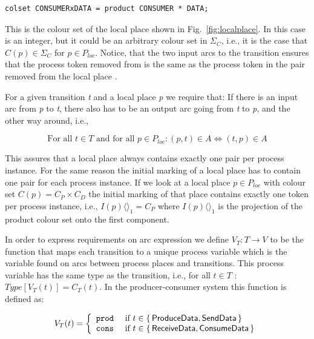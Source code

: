 \begin{verbatim}
colset CONSUMERxDATA = product CONSUMER * DATA;
\end{verbatim} 

\noindent
This is the colour set of the local place  shown in Fig.~\ref{fig:localplace}. In this case  is an integer, but it could be an arbitrary colour set in $\Sigma_{C}$, i.e., it is the case that $C(p) \in \Sigma_{C}$ for $p \in P_{loc}$. Notice, that the two input arcs to the transition  ensures that the process token removed from  is the same as the process token in the  pair removed from the local place .

For a given transition \emph{t} and a local place \emph{p} we require that: If there is an input arc from \emph{p} to \emph{t}, there also has to be an output arc going from \emph{t} to \emph{p}, and the other way around, i.e.,

\begin{displaymath}
\text{For all } t \in T \text{ and for all } p \in P_{loc} : (p, t) \in A \Leftrightarrow (t, p) \in A
\end{displaymath}

\noindent
This assures that a local place always contains exactly one pair per process instance. For the same reason the initial marking of a local place has to contain one pair for each process instance. If we look at a local place $p \in P_{loc}$ with colour set $C(p) = C_{P} \times C_{D}$ the initial marking of that place contains exactly one token per process instance, i.e., $I(p)\langle \rangle_{1} = C_{P}$ where $I(p)\langle \rangle_{1}$ is the projection of the product colour set onto the first component.


In order to express requirements on arc expression we define $V_{T}: T \rightarrow V$ to be the function that maps each transition to a unique process variable which is the variable found on arcs between process places and transitions. This process variable has the same type as the transition, i.e., for all $t \in T$ : $Type[V_{T}(t)] = C_{T}(t)$. In the producer-consumer system this function is defined as:

\begin{displaymath}
V_{T}(t) = \left\{ 
\begin{array}{ll}
\texttt{prod} & \mbox{ if }  t \in \{\,\textsf{ProduceData}, \textsf{SendData}\,\} \\
\texttt{cons} & \mbox{ if }  t \in \{\,\textsf{ReceiveData}, \textsf{ConsumeData}\,\}
\end{array}\right.
\end{displaymath}

